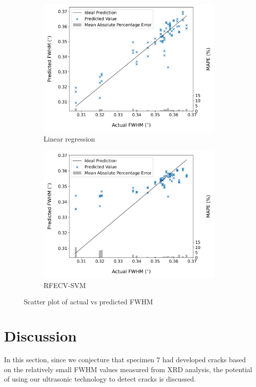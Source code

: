 \begin{figure}[tb]
  \centering
  \begin{subfigure}[t]{\linewidth}
    \centering
    \includegraphics[width=0.8\linewidth]{fig/fwhm_predict_vs_true_lr.png}
    \caption{Linear regression}
    \label{fig: fwhm prediction lr}
  \end{subfigure}
  \begin{subfigure}[t]{\linewidth}
    \centering
    \includegraphics[width=0.8\linewidth]{fig/fwhm_predict_vs_true_svm.png}
    \caption{RFECV-SVM}
    \label{fig: fwhm prediction svm}
  \end{subfigure}

  \caption{Scatter plot of actual vs predicted FWHM}
  \label{fig: fwhm prediction}
\end{figure}

\section{Discussion}
\label{sec: reg discussion}
In this section, since we conjecture that specimen 7 had developed cracks based on the relatively small FWHM values measured from XRD analysis, the potential of using our ultrasonic technology to detect cracks is discussed.

